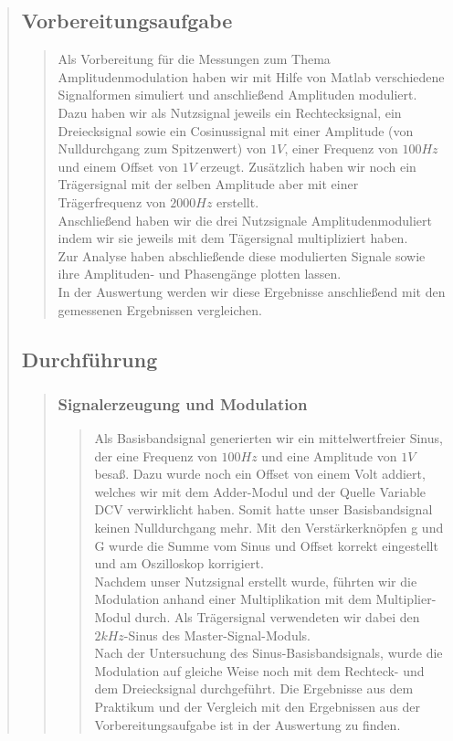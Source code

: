 \begin{quote}
    \subsection{Vorbereitungsaufgabe}
    \begin{quote}
        Als Vorbereitung für die Messungen zum Thema Amplitudenmodulation haben wir mit Hilfe von Matlab verschiedene
        Signalformen simuliert und anschließend Amplituden moduliert.\\
        Dazu haben wir als Nutzsignal jeweils ein Rechtecksignal, ein Dreiecksignal sowie ein Cosinussignal mit
        einer Amplitude (von Nulldurchgang zum Spitzenwert) von $1V$, einer Frequenz von $100 Hz$ und einem Offset von
        $1V$ erzeugt.
        Zusätzlich haben wir noch ein Trägersignal mit der selben Amplitude aber mit einer Trägerfrequenz von $2000 Hz$ erstellt.\\
        Anschließend haben wir die drei Nutzsignale Amplitudenmoduliert indem wir sie jeweils mit dem Tägersignal
        multipliziert haben.\\
        Zur Analyse haben abschließende diese modulierten Signale sowie ihre Amplituden- und Phasengänge plotten
        lassen.\\
        In der Auswertung werden wir diese Ergebnisse anschließend mit den gemessenen Ergebnissen vergleichen.
    \end{quote}
    
    \subsection{Durchführung}
    \begin{quote}
    	\subsubsection{Signalerzeugung und Modulation}
    	\begin{quote}
    	Als Basisbandsignal generierten wir ein mittelwertfreier Sinus,
    	der eine Frequenz von $100 Hz$ und eine Amplitude von $1 V$ besaß. Dazu wurde noch
    	ein Offset von einem Volt addiert, welches wir mit dem Adder-Modul und der
    	Quelle Variable DCV verwirklicht haben. Somit hatte unser Basisbandsignal
    	keinen Nulldurchgang mehr. Mit den Verstärkerknöpfen g und G wurde die
    	Summe vom Sinus und Offset korrekt eingestellt und am Oszilloskop
    	korrigiert.\\
    	Nachdem unser Nutzsignal erstellt wurde, führten wir die Modulation anhand
    	einer Multiplikation mit dem Multiplier-Modul durch. Als Trägersignal
    	verwendeten wir dabei den $2kHz$-Sinus des Master-Signal-Moduls.\\
    	Nach der Untersuchung des Sinus-Basisbandsignals, wurde die Modulation auf
    	gleiche Weise noch mit dem Rechteck- und dem Dreiecksignal durchgeführt.
    	Die Ergebnisse aus dem Praktikum und der Vergleich mit den Ergebnissen aus
    	der Vorbereitungsaufgabe ist in der Auswertung zu finden.
    	\end{quote}
    	

\end{quote}
\end{quote}
